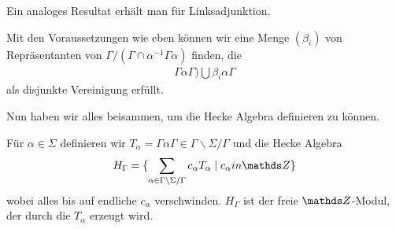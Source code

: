 Ein analoges Resultat erhält man für Linksadjunktion.
\begin{bem}
Mit den Voraussetzungen wie eben können wir eine Menge $(\beta_i)$
von Repräsentanten von $\Gamma/(\Gamma \cap \alpha^{-1} \Gamma \alpha)$ finden, die
\begin{align*}
\Gamma \alpha \Gamma)\bigcup \beta_i \alpha \Gamma
\end{align*}
als disjunkte Vereinigung erfüllt.
\end{bem}

Nun haben wir alles beisammen, um die Hecke Algebra definieren zu können.
\begin{defi}
Für $\alpha \in \Sigma$ definieren wir $T_\alpha=\Gamma \alpha \Gamma \in \Gamma \backslash \Sigma /\Gamma$
und die Hecke Algebra
\begin{align*}
H_\Gamma = \{ \sum_{\alpha \in \Gamma \backslash \Sigma /\Gamma} c_\alpha T_\alpha \mid c_\alpha in \Z\}
\end{align*}
wobei alles bis auf endliche $c_\alpha$ verschwinden.
$H_\Gamma$ ist der freie $\Z$-Modul, der durch die $T_\alpha$ erzeugt wird.
\end{defi}

